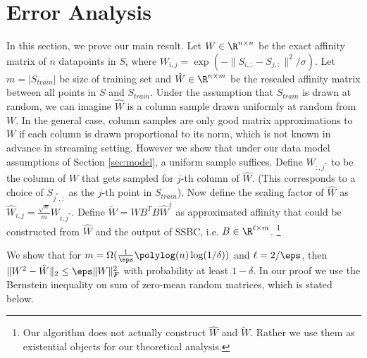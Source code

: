 \documentclass{sig-alternate}
\begin{document}
\section{Error Analysis}\label{sec:err}
In this section, we prove our main result. 
Let $W \in \R^{n \times n}$ be the exact affinity matrix of $n$ datapoints in $S$, where $W_{i,j} = \exp(-\|S_{i,:} - S_{j,:}\|^2/\sigma)$. 
Let $m = |S_{train}|$ be size of training set and $\hat W \in \R^{n \times m}$ be the rescaled affinity matrix between all points in $S$ and $S_{train}$. 
Under the assumption that $S_{train}$ is drawn at random, we can imagine $\hat W$ is a column sample drawn uniformly at random from $W$.
In the general case, column samples are only good matrix approximations to $W$ if each column is drawn proportional to its norm, which is not known in advance in streaming setting. However we show that under our data model assumptions of Section \ref{sec:model}, a uniform sample suffices.
Define $W_{:, j^*}$ to be the column of $W$ that gets sampled for $j$-th column of $\hat W$. (This corresponds to a choice of $S_{j^*,:}$ as the $j$-th point in $S_{train}$). Now define the scaling factor of $\hat{W}$ as $\hat{W}_{i,j} = \frac{\sqrt{n}}{m} W_{i, j^*}$. 
Define $\tilde W = \hat W B^T B \hat{W}^\dagger$ as approximated affinity that could be constructed from $\hat{W}$ and the output of SSBC, i.e. $B \in \R^{\ell \times m}$. 
\footnote{Our algorithm does not actually construct $\hat W$ and $\tilde W$. Rather we use them as existential objects for our theoretical analysis.}

 We show that for $m = \Omega(\frac{1}{\eps} \polylog(n) \log(1 / \delta))$ and $\ell = 2/\eps$, then $\|W^2 - \tilde W\|_2 \leq \eps \|W\|_F^2$ with probability at least $1-\delta$.
In our proof we use the Bernstein inequality on sum of zero-mean random matrices, which is stated below.
\end{document}

